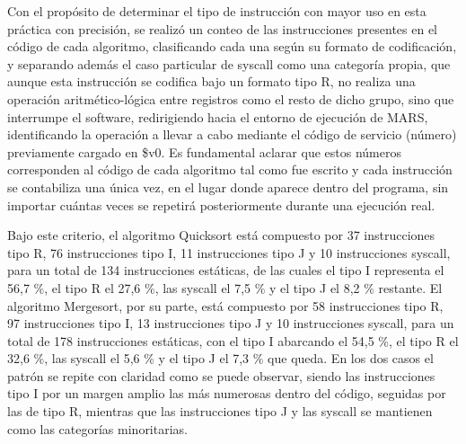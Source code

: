 \documentclass[12pt, letterpaper]{article}
\begin{document}
Con el propósito de determinar el tipo de instrucción con mayor uso en esta práctica con precisión, se realizó un conteo de las instrucciones presentes en el código de cada algoritmo, clasificando cada una según su formato de codificación, y separando además el caso particular de syscall como una categoría propia, que aunque esta instrucción se codifica bajo un formato tipo R, no realiza una operación aritmético-lógica entre registros como el resto de dicho grupo, sino que interrumpe el software, redirigiendo hacia el entorno de ejecución de MARS, identificando la operación a llevar a cabo mediante el código de servicio (número) previamente cargado en \$v0. Es fundamental aclarar que estos números corresponden al código de cada algoritmo tal como fue escrito y cada instrucción se contabiliza una única vez, en el lugar donde aparece dentro del programa, sin importar cuántas veces se repetirá posteriormente durante una ejecución real. 

Bajo este criterio, el algoritmo Quicksort está compuesto por 37 instrucciones tipo R, 76 instrucciones tipo I, 11 instrucciones tipo J y 10 instrucciones syscall, para un total de 134 instrucciones estáticas, de las cuales el tipo I representa el 56,7 \%, el tipo R el 27,6 \%, las syscall el 7,5 \% y el tipo J el 8,2 \% restante. El algoritmo Mergesort, por su parte, está compuesto por 58 instrucciones tipo R, 97 instrucciones tipo I, 13 instrucciones tipo J y 10 instrucciones syscall, para un total de 178 instrucciones estáticas, con el tipo I abarcando el 54,5 \%, el tipo R el 32,6 \%, las syscall el 5,6 \% y el tipo J el 7,3 \% que queda. En los dos casos el patrón se repite con claridad como se puede observar, siendo las instrucciones tipo I por un margen amplio las más numerosas dentro del código, seguidas por las de tipo R, mientras que las instrucciones tipo J y las syscall se mantienen como las categorías minoritarias.
\end{document}
